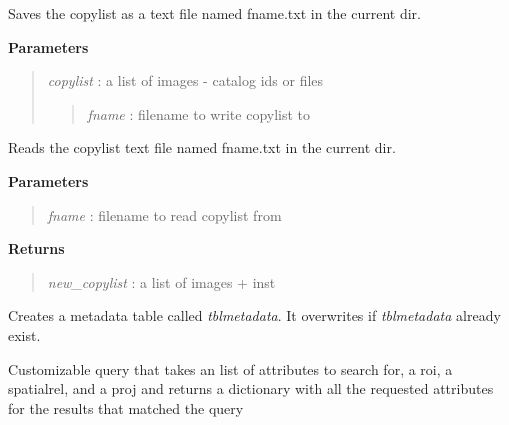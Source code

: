 \documentclass[letterpaper,10pt,openany,oneside]{sphinxmanual}
\begin{document}
\begin{fulllineitems}

\begin{fulllineitems}
\label{code:Database.Database.copylistExport}
Saves the copylist as a text file named fname.txt in the current dir.

\textbf{Parameters}
\begin{quote}

\emph{copylist} : a list of images - catalog ids or files
\begin{quote}

\emph{fname}    : filename to write copylist to
\end{quote}
\end{quote}

\end{fulllineitems}


\begin{fulllineitems}
\label{code:Database.Database.copylistImport}
Reads the copylist text file named fname.txt in the current dir.

\textbf{Parameters}
\begin{quote}

\emph{fname}         : filename to read copylist from
\end{quote}

\textbf{Returns}
\begin{quote}

\emph{new\_copylist} : a list of images + inst
\end{quote}

\end{fulllineitems}


\begin{fulllineitems}
\label{code:Database.Database.createTblMetadata}
Creates a metadata table called \emph{tblmetadata}. It overwrites if \emph{tblmetadata} already exist.

\end{fulllineitems}


\begin{fulllineitems}
\label{code:Database.Database.customizedQuery}
Customizable query that takes an list of attributes to search for, a roi, a spatialrel, and a proj
and returns a dictionary with all the requested attributes for the results that matched the query


\end{fulllineitems}
\end{fulllineitems}
\end{document}
